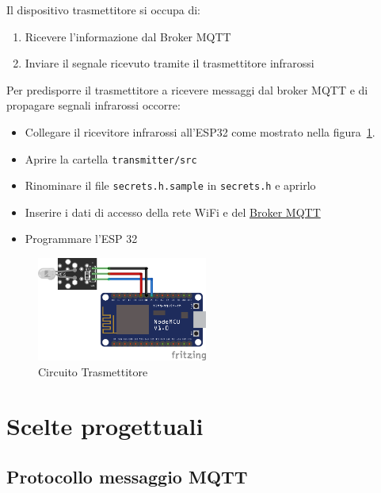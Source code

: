 \documentclass[a4paper,11pt]{article}
\begin{document}
    Il dispositivo trasmettitore si occupa di:

    \begin{enumerate}
        \item Ricevere l'informazione dal Broker MQTT
        \item Inviare il segnale ricevuto tramite il trasmettitore infrarossi
    \end{enumerate}

    Per predisporre il trasmettitore a ricevere messaggi dal broker MQTT e di propagare segnali infrarossi occorre:

    \begin{itemize}
        \item Collegare il ricevitore infrarossi all'ESP32 come mostrato nella figura~\ref{fig:circuito_trasmettitore}.
            
        \item Aprire la cartella \texttt{transmitter/src}
        \item Rinominare il file \texttt{secrets.h.sample} in \texttt{secrets.h} e aprirlo
        \item Inserire i dati di accesso della rete WiFi e del \hyperref[subsec:Broker]{Broker MQTT}
        \item Programmare l'ESP 32
    \end{itemize}

    \begin{figure}[H]
        \centering
        \includegraphics[width=0.5\textwidth,height=\textheight,keepaspectratio]{assets/transmitter_fritzing}
        \caption{Circuito Trasmettitore}
        \label{fig:circuito_trasmettitore}
    \end{figure}

\section{Scelte progettuali}

    \subsection{Protocollo messaggio MQTT}
\end{document}
